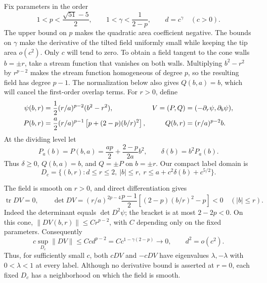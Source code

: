 Fix parameters in the order
\begin{equation}
 1<p<\frac{\sqrt{51}-5}{2},\qquad
 1<\gamma<\frac1{2-p},\qquad
 d=c^\gamma\quad(c>0).
 \label{c:sing-parameters}
\end{equation}
The upper bound on $p$ makes the quadratic area coefficient negative.
The bounds on $\gamma$ make the derivative of the tilted field uniformly
small while keeping the tip area $o(c^2)$.
Only $c$ will tend to zero.  To obtain a field tangent to the cone walls
$b=\pm r$, take a stream function that vanishes on both walls.
Multiplying $b^2-r^2$ by $r^{p-2}$ makes the stream function homogeneous
of degree $p$, so the resulting field has degree $p-1$.  The normalization
below also gives $Q(b,a)=b$, which will cancel the first-order overlap terms.
For $r>0$, define
\begin{align}
 \psi(b,r)&=\frac12(r/a)^{p-2}(b^2-r^2),
 &V=(P,Q)&=(-\partial_r\psi,\partial_b\psi),\notag\\
 P(b,r)&=\frac a2(r/a)^{p-1}
       \left[p+(2-p)(b/r)^2\right],
 &Q(b,r)&=(r/a)^{p-2}b.
 \label{c:sing-field}
\end{align}
At the dividing level let
\begin{equation}
 P_a(b)=P(b,a)=\frac{ap}{2}+\frac{2-p}{2a}b^2,
 \qquad \delta(b)=b^2P_a(b).
 \label{c:sing-ceiling-polynomial}
\end{equation}
Thus $\delta\ge0$, $Q(b,a)=b$, and $Q=\pm P$ on $b=\pm r$.
Our compact label domain is
\begin{equation}
 D_c=\{(b,r):d\le r\le2,\ |b|\le r,
                  \ r\le a+c^2\delta(b)+c^{5/2}\}.
 \label{c:sing-domain}
\end{equation}

The field is smooth on $r>0$, and direct differentiation gives
\begin{equation}
 \operatorname{tr}DV=0,\qquad
 \det DV=(r/a)^{2p-4}\frac{p-1}{2}
               \left[(2-p)(b/r)^2-p\right]<0
 \quad (|b|\le r).
 \label{c:sing-hyperbolicity}
\end{equation}
Indeed the determinant equals $\det D^2\psi$; the bracket is at most
$2-2p<0$.  On this cone,
$\|DV(b,r)\|\le C r^{p-2}$, with $C$ depending only on the fixed
parameters.  Consequently
\begin{equation}
 c\sup_{D_c}\|DV\|\le Cc d^{p-2}
   =C c^{1-\gamma(2-p)}\longrightarrow0,
 \qquad d^2=o(c^2).
 \label{c:sing-cutoff-estimates}
\end{equation}
Thus, for sufficiently small $c$, both $cDV$ and $-cDV$ have
eigenvalues $\lambda,-\lambda$ with $0<\lambda<1$ at every label.
Although no derivative bound is asserted at $r=0$, each fixed $D_c$
has a neighborhood on which the field is smooth.

